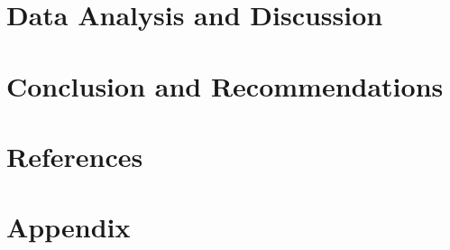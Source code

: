 \documentclass[a4paper,11]{article}
\begin{document}
\section{Data Analysis and Discussion}

\pagebreak

\section{Conclusion and Recommendations}

\pagebreak

\section{References}

\pagebreak


\section{Appendix}

\end{document}
